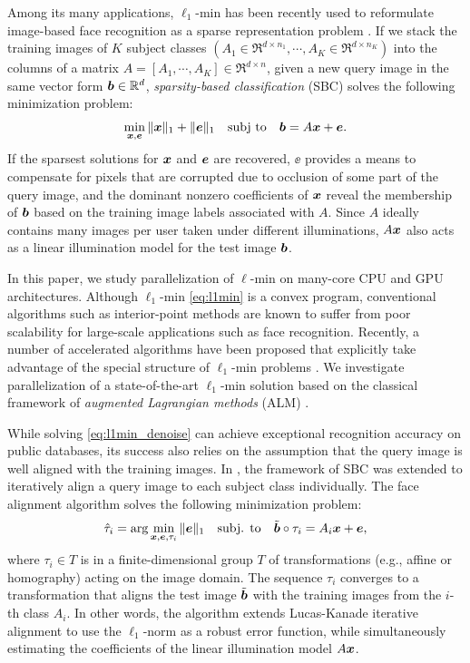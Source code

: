 \documentclass[10pt,twocolumn,letterpaper]{article}
\begin{document}
Among its many applications, $\ell_1$-min has been recently used to reformulate
image-based face recognition as a sparse representation problem
\cite{WrightJ2009-PAMI}.  If we stack the training images of $K$ subject
classes $(A_1\in\Re^{d\times n_1}, \cdots, A_K\in\Re^{d\times n_K})$ into the
columns of a matrix $A = [A_1, \cdots, A_K]\in\Re^{d\times n}$, given a new
query image in the same vector form ${\boldsymbol{b}}\in{\mathbb{R}}^d$, \emph{sparsity-based
classification} (SBC) solves the following minimization problem:
\begin{equation}
\min_{{\boldsymbol{x}}, {\boldsymbol{e}}} \| {\boldsymbol{x}} \|_1 + \|{\boldsymbol{e}}\|_1 \quad \textup{subj to} \quad {\boldsymbol{b}} = A {\boldsymbol{x}} + {\boldsymbol{e}}.
\label{eq:l1min_denoise}
\end{equation}
If the sparsest solutions for ${\boldsymbol{x}}$ and $\boldsymbol{e}$ are recovered, $\ee$ provides a
means to compensate for pixels that are corrupted due to occlusion of some part of the query
image, and the dominant nonzero coefficients of ${\boldsymbol{x}}$ reveal the membership of
${\boldsymbol{b}}$ based on the training image labels associated with $A$.  Since $A$ ideally
contains many images per user taken under different illuminations, 
$A{\boldsymbol{x}}$ also acts as a linear illumination model for the test image ${\boldsymbol{b}}$.

In this paper, we study parallelization of $\ell$-min on many-core CPU and GPU
architectures. Although $\ell_1$-min \eqref{eq:l1min} is a convex
program, conventional algorithms such as interior-point methods
\cite{ChenS2001-SIAM,TibshiraniR1996} are known to suffer from poor scalability
for large-scale applications such as face recognition. Recently, a number of
accelerated algorithms have been proposed that explicitly take advantage of
the special structure of $\ell_1$-min problems
\cite{LorisI2009,YangA2010-ICIP}. We investigate parallelization of a
state-of-the-art $\ell_1$-min solution based on the classical framework of
\emph{augmented Lagrangian methods} (ALM) \cite{BertsekasD2003,YangA2010-ICIP}.

While solving \eqref{eq:l1min_denoise} can achieve exceptional
recognition accuracy on public databases, its success also relies on the assumption
that the query image is well aligned with the training images. In
\cite{WagnerA2009-CVPR}, the framework of SBC was extended to iteratively align
a query image to each subject class individually. The face alignment algorithm solves
the following minimization problem:
\begin{equation}
\hat{\tau}_i = \arg\min_{{\boldsymbol{x}}, {\boldsymbol{e}}, \tau_i} \|{\boldsymbol{e}}\|_1\quad \mbox{subj. to}\quad \tilde{{\boldsymbol{b}}}\circ\tau_i = A_i{\boldsymbol{x}} + {\boldsymbol{e}},
\label{eq:l1min_alignment}
\end{equation}
where $\tau_i\in T$ is in a finite-dimensional group $T$ of transformations
(e.g., affine or homography) acting on the image domain.  The sequence
$\tau_i$ converges to a transformation that aligns the test image $\tilde{{\boldsymbol{b}}}$
with the training images from the $i$-th class $A_i$. In other words, the algorithm 
extends Lucas-Kanade iterative alignment \cite{LucasB1981} to use the
$\ell_1$-norm as a robust error function, while simultaneously estimating
the coefficients of the linear illumination model $A{\boldsymbol{x}}$.  
\end{document}
